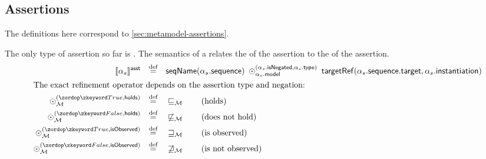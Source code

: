 \subsection{Assertions}

The definitions here correspond to \cref{sec:metamodel-assertions}.

\begin{defn}[\massertion]

\newcommand{\refop}[3]{\mathbin{\odot_{#1}^{(#2, #3)}}}

The only type of assertion so far is \msequenceassertion.  The semantics of a
\msequenceassertion{} relates the \msequence{} of the assertion to the
\mtarget{} of the assertion.
%
\begin{align*}
	\asstsema{\asasst}
\quad\defeq\quad&
	\seqnameOf{\field{\asasst}{sequence}}
	\;
	\refop{\field{\asasst}{model}}{\field{\asasst}{isNegated}}{\field{\asasst}{type}}
	\;
	\targetRef{\field{\field{\asasst}{sequence}}{target}}{\field{\asasst}{instantiation}}
\\
\intertext{The exact refinement operator depends on the assertion type and
negation:}
	\refop{\amodel}{\true}{\mathsf{holds}}
\quad\defeq\quad&
	\sqsubseteq_\amodel
\tag{holds}
\\
	\refop{\amodel}{\false}{\mathsf{holds}}
\quad\defeq\quad&
	\not\sqsubseteq_\amodel
\tag{does not hold}
\\
	\refop{\amodel}{\true}{\mathsf{isObserved}}
\quad\defeq\quad&
	\sqsupseteq_\amodel
\tag{is observed}
\\
	\refop{\amodel}{\false}{\mathsf{isObserved}}
\quad\defeq\quad&
	\not\sqsupseteq_\amodel
\tag{is not observed}
\\
\end{align*}
\end{defn}